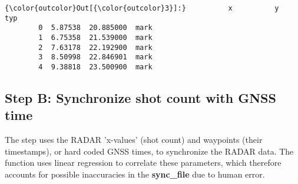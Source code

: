 \documentclass[11pt]{article}
\begin{document}
\begin{Verbatim}[commandchars=\\\{\}]
{\color{outcolor}Out[{\color{outcolor}3}]:}          x          y   typ
        0  5.87538  20.885000  mark
        1  6.75358  21.539000  mark
        2  7.63178  22.192900  mark
        3  8.50998  22.846901  mark
        4  9.38818  23.500900  mark
\end{Verbatim}
            
    \subsection{Step B: Synchronize shot count with GNSS
time}\label{step-b-synchronize-shot-count-with-gnss-time}

The step uses the RADAR 'x-values' (shot count) and waypoints (their
timestamps), or hard coded GNSS times, to synchronize the RADAR data.
The function uses linear regression to correlate these parameters, which
therefore accounts for possible inaccuracies in the \textbf{sync\_file}
due to human error.
\end{document}
